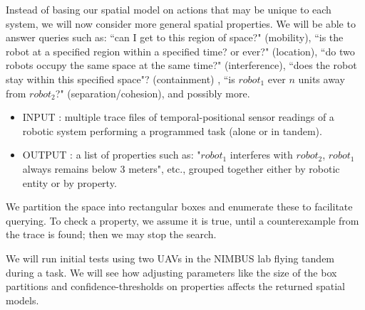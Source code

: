 \documentclass{article}
\begin{document}
%
%
%
Instead of basing our spatial model on actions that may be unique to each system, we will now consider more general spatial properties.
We will be able to answer queries such as: ``can I get to this region of space?" (mobility), ``is the robot at a specified region within a specified time? or ever?" (location), ``do two robots occupy the same space at the same time?" (interference), ``does the robot stay within this specified space"? (containment) , ``is $robot_1$ ever $n$ units away from $robot_2$?" (separation/cohesion), and possibly more.

\begin{itemize}
  \item INPUT : multiple trace files of temporal-positional sensor readings of a robotic system performing a programmed task (alone or in tandem).

  \item OUTPUT : a list of properties such as: "$robot_1$ interferes with $robot_2$, $robot_1$ always remains below 3 meters", etc., grouped together either by robotic entity or by property.
\end{itemize} 
 
We partition the space into rectangular boxes and enumerate these to facilitate querying.
To check a property, we assume it is true, until a counterexample from the trace is found; then we may stop the search.
  
We will run initial tests using two UAVs in the NIMBUS lab flying tandem during a task.  We will see how adjusting parameters like the size of the box partitions and confidence-thresholds on properties affects the returned spatial models. 




\end{document}
